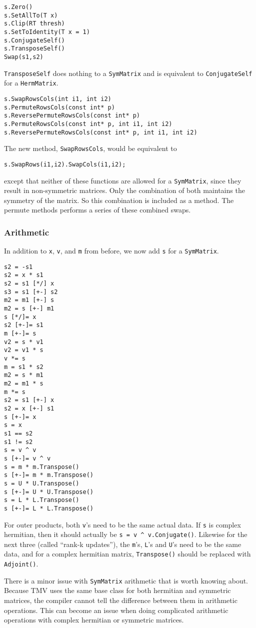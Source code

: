 \documentclass[twoside,letterpaper,11pt]{article}
\renewcommand{\tt}[1]{{\texttt {#1}}}
\begin{document}
\begin{verbatim}
s.Zero()
s.SetAllTo(T x)
s.Clip(RT thresh)
s.SetToIdentity(T x = 1)
s.ConjugateSelf()
s.TransposeSelf()
Swap(s1,s2)
\end{verbatim}
\tt{TransposeSelf} does nothing to a \tt{SymMatrix} and is equivalent to
\tt{ConjugateSelf} for a \tt{HermMatrix}.
\begin{verbatim}
s.SwapRowsCols(int i1, int i2)
s.PermuteRowsCols(const int* p)
s.ReversePermuteRowsCols(const int* p)
s.PermuteRowsCols(const int* p, int i1, int i2)
s.ReversePermuteRowsCols(const int* p, int i1, int i2)
\end{verbatim}
The new method, \tt{SwapRowsCols}, would be equivalent to 
\begin{verbatim}
s.SwapRows(i1,i2).SwapCols(i1,i2);
\end{verbatim}
except that neither of these functions are allowed for a \tt{SymMatrix}, since 
they result in non-symmetric matrices.  Only the combination of both
maintains the symmetry of the matrix.  So this combination is included as
a method.  The permute methods performs a series of these
combined swaps.

\subsubsection{Arithmetic}
\label{symarith}

In addition to \tt{x}, \tt{v}, and \tt{m} from before,
we now add \tt{s} for a \tt{SymMatrix}.

\begin{verbatim}
s2 = -s1
s2 = x * s1
s2 = s1 [*/] x
s3 = s1 [+-] s2
m2 = m1 [+-] s
m2 = s [+-] m1
s [*/]= x
s2 [+-]= s1
m [+-]= s
v2 = s * v1
v2 = v1 * s
v *= s
m = s1 * s2
m2 = s * m1
m2 = m1 * s
m *= s
s2 = s1 [+-] x
s2 = x [+-] s1
s [+-]= x
s = x
s1 == s2
s1 != s2
s = v ^ v
s [+-]= v ^ v
s = m * m.Transpose()
s [+-]= m * m.Transpose()
s = U * U.Transpose()
s [+-]= U * U.Transpose()
s = L * L.Transpose()
s [+-]= L * L.Transpose()
\end{verbatim}
For outer products, both \tt{v}'s need to be the same actual data.  If \tt{s}
is complex hermitian, then it should actually be \tt{s = v \^{} v.Conjugate()}.
Likewise for the next three (called ``rank-k updates''), the \tt{m}'s, \tt{L}'s and
\tt{U}'s need to be the
same data, and for a complex hermitian matrix, \tt{Transpose()}
should be replaced with \tt{Adjoint()}.

There is a minor issue with \tt{SymMatrix} arithmetic that is
worth knowing about.
Because TMV uses the same base class for both hermitian and symmetric
matrices, the compiler cannot tell the difference between them in arithmetic
operations.  
This can become an issue when doing complicated arithmetic operations
with complex hermitian or symmetric matrices.
\end{document}
